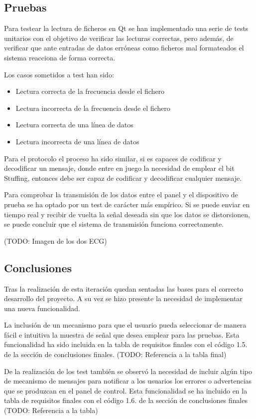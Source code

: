     \subsection{Pruebas}

        Para testear la lectura de ficheros en Qt se han implementado una serie de tests unitarios con el objetivo de verificar las lecturas correctas, pero además, de verificar que ante entradas de datos erróneas como ficheros mal formateados el sistema reacciona de forma correcta.

        Los casos sometidos a test han sido:

        \begin{itemize}
                \item Lectura correcta de la frecuencia desde el fichero
                \item Lectura incorrecta de la frecuencia desde el fichero
                \item Lectura correcta de una línea de datos
                \item Lectura incorrecta de una línea de datos
        \end{itemize}

        Para el protocolo el proceso ha sido similar, si es capaces de codificar y decodificar un mensaje, donde entre en juego la necesidad de emplear el bit Stuffing, entonces debe ser capaz de codificar y decodificar cualquier mensaje.

        Para comprobar la transmisión de los datos entre el panel y el dispositivo de prueba se ha optado por un test de carácter más empírico. Si se puede enviar en tiempo real y recibir de vuelta la señal deseada sin que los datos se distorsionen, se puede concluir que el sistema de transmisión funciona correctamente.

        (TODO: Imagen de los dos ECG)


    \subsection{Conclusiones}

        Tras la realización de esta iteración quedan sentadas las bases para el correcto desarrollo del proyecto. A su vez se hizo presente la necesidad de implementar una nueva funcionalidad.

        La inclusión de un mecanismo para que el usuario pueda seleccionar de manera fácil e intuitiva la muestra de señal que desea emplear para las pruebas. Esta funcionalidad ha sido incluida en la tabla de requisitos finales con el código 1.5. de la sección de conclusiones finales. (TODO: Referencia a la tabla final)

        De la realización de los test también se observó la necesidad de incluir algún tipo de mecanismo de mensajes para notificar a los usuarios los errores o advertencias que se produzcan en el panel de control. Esta funcionalidad se ha incluido en la tabla de requisitos finales con el código 1.6. de la sección de conclusiones finales (TODO: Referencia a la tabla)
        